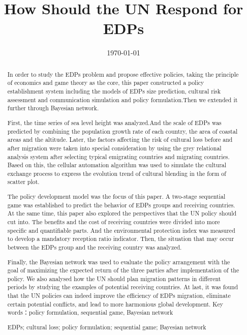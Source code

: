 \documentclass{mcmthesis}
\title{How Should the UN Respond for EDPs}%
\date{\today}
\begin{document}
\begin{abstract}
	
In order to study the EDPs problem and propose effective policies, taking the principle of economics and game theory as the core, this paper constructed a policy establishment system including the models of EDPs size prediction, cultural risk assessment and communication simulation and policy formulation.Then we extended it further through Bayesian network.

First, the time series of sea level height was analyzed.And the scale of EDPs was predicted by combining the population growth rate of each country, the area of coastal areas and the altitude.
Later, the factors affecting the risk of cultural loss before and after migration were taken into special consideration by using the grey relational analysis system after selecting typical emigrating countries and migrating countries. Based on this, the cellular automation algorithm was used to simulate the cultural exchange process to express the evolution trend of cultural blending in the form of scatter plot.

The policy development model was the focus of this paper. A two-stage sequential game was established to predict the behavior of EDPs groups and receiving countries. At the same time, this paper also explored the perspectives that the UN policy should cut into. The benefits and the cost of receiving countries were divided into more specific and quantifiable parts. And the environmental protection index was measured to develop a mandatory reception ratio indicator. Then, the situation that may occur between the EDPs group and the receiving country was analyzed.

Finally, the Bayesian network was used to evaluate the policy arrangement with the goal of maximizing the expected return of the three parties after implementation of the policy. We also analysed how the UN should plan migration patterns in different periods by studying the examples of potential receiving countries. At last, it was found that the UN policies can indeed improve the efficiency of EDPs migration, eliminate certain potential conflicts, and lead to more harmonious global development.
Key words：policy formulation, sequential game, Bayesian network
\begin{keywords}
EDPs; cultural loss; policy formulation; sequential game; Bayesian network
\end{keywords}
\end{abstract}
\maketitle
\tableofcontents
\newpage
\end{document}
